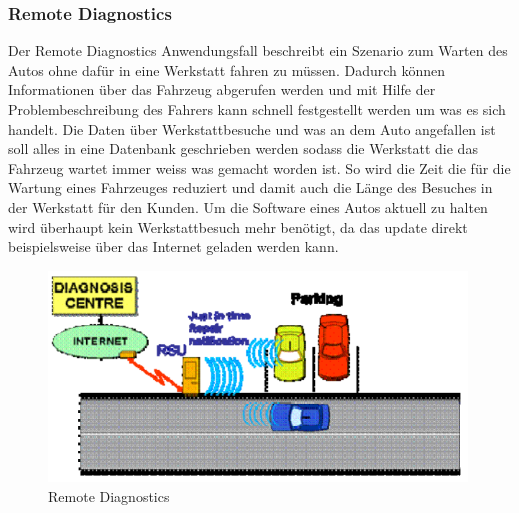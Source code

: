 \subsubsection{Remote Diagnostics}
Der Remote Diagnostics Anwendungsfall beschreibt ein Szenario zum Warten des Autos ohne dafür in eine Werkstatt fahren zu müssen. Dadurch können Informationen über das Fahrzeug abgerufen werden und mit Hilfe der Problembeschreibung des Fahrers kann schnell festgestellt werden um was es sich handelt. Die Daten über Werkstattbesuche und was an dem Auto angefallen ist soll alles in eine Datenbank geschrieben werden sodass die Werkstatt die das Fahrzeug wartet immer weiss was gemacht worden ist. So wird die Zeit die für die Wartung eines Fahrzeuges reduziert und damit auch die Länge des Besuches in der Werkstatt für den Kunden. Um die Software eines Autos aktuell zu halten wird überhaupt kein Werkstattbesuch mehr benötigt, da das update direkt beispielsweise über das Internet geladen werden kann.
\begin{figure}[htbp]
\includegraphics[width=0.99\textwidth]{content/images/06_use_cases/rds.png}
\caption{Remote Diagnostics}
\label{fig:redia}
\end{figure}
